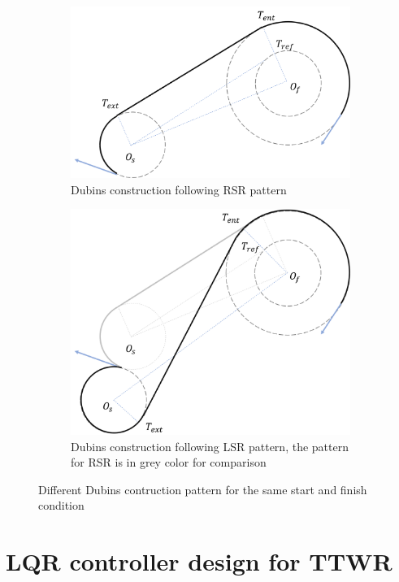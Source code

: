\begin{figure}
     \centering
     \begin{subfigure}[b]{0.8\textwidth}
         \centering
         \includegraphics[width=0.7\linewidth]{fig/dubins/dubins_construction_rsr.png}
         \caption{Dubins construction following RSR pattern}
         \label{fig: dubins pattern consturction RSR}
     \end{subfigure}
     \vfill 
     \begin{subfigure}[b]{0.8\textwidth}
         \centering
         \includegraphics[width=0.7\linewidth]{fig/dubins/dubins_construction_lsr.png}
         \caption{Dubins construction following LSR pattern, the pattern for RSR is in grey color for comparison}
         \label{fig: dubins pattern consturction LSR}
     \end{subfigure}
        \caption{Different Dubins contruction pattern for the same start and finish condition}
        \label{fig:dubins pattern difference for same condition}
\end{figure}

\section{LQR controller design for TTWR}

